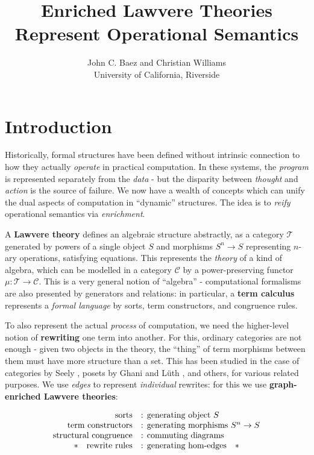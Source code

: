 \documentclass[a4paper,UKenglish]{article}
\newcommand{\C}{\mathscr{C}}
\newcommand{\T}{\mathscr{T}}
\begin{document}
\title{Enriched Lawvere Theories Represent Operational Semantics}
\author{John C. Baez and Christian Williams\\University of California, Riverside}

\maketitle

\section{Introduction}

Historically, formal structures have been defined without intrinsic connection to how they actually \textit{operate} in practical computation. In these systems, the \textit{program} is represented separately from the \textit{data} - but the disparity between \textit{thought} and \textit{action} is the source of failure. We now have a wealth of concepts which can unify the dual aspects of computation in ``dynamic'' structures. The idea is to \textit{reify} operational semantics via \textit{enrichment}.

A \textbf{Lawvere theory} \cite{lawvere} defines an algebraic structure abstractly, as a category $\T$ generated by powers of a single object $S$ and morphisms $S^n \to S$ representing $n$-ary operations, satisfying equations. This represents the \textit{theory} of a kind of algebra, which can be modelled in a category $\C$ by a power-preserving functor $\mu:\T \to \C$. This is a very general notion of ``algebra'' - computational formalisms are also presented by generators and relations: in particular, a \textbf{term calculus} represents a \textit{formal language} by sorts, term constructors, and congruence rules.

To also represent the actual \textit{process} of computation, we need the higher-level notion of \textbf{rewriting} one term into another. For this, ordinary categories are not enough - given two objects in the theory, the ``thing'' of term morphisms between them must have more structure than a set. This has been studied in the case of categories by Seely \cite{seely}, posets by Ghani and L\"uth \cite{ghani}, and others, for various related purposes. We use \textit{edges} to represent \textit{individual} rewrites: for this we use \textbf{graph-enriched Lawvere theories}:

\[\begin{array}{rl}
\text{sorts} & \text{: generating object } S\\
\text{term constructors} & \text{: generating morphisms } S^n \to S\\
\text{structural congruence} & \text{: commuting diagrams}\\
\text{\textasteriskcentered \quad rewrite rules} & \text{: generating hom-edges\quad\textasteriskcentered}\\
\end{array}\]
\end{document}
